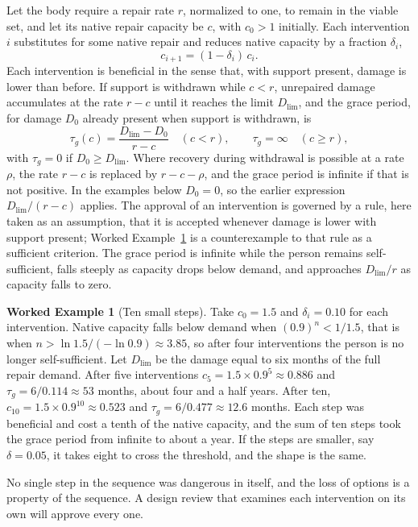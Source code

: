 \documentclass[11pt,openany]{book}
\theoremstyle{definition}
\newtheorem{example}{Worked Example}[chapter]
\theoremstyle{remark}
\begin{document}
Let the body require a repair rate $r$, normalized to one, to remain in the viable set, and let its native repair capacity be $c$, with $c_0>1$ initially. Each intervention $i$ substitutes for some native repair and reduces native capacity by a fraction $\delta_i$,
\begin{equation}
c_{i+1}=(1-\delta_i)\,c_i.
\label{eq:erode}
\end{equation}
Each intervention is beneficial in the sense that, with support present, damage is lower than before. If support is withdrawn while $c<r$, unrepaired damage accumulates at the rate $r-c$ until it reaches the limit $D_{\lim}$, and the grace period, for damage $D_0$ already present when support is withdrawn, is
\begin{equation}
\tau_g(c)=\frac{D_{\lim}-D_0}{r-c}\quad(c<r),\qquad\tau_g=\infty\quad(c\ge r),
\label{eq:grace}
\end{equation}
with $\tau_g=0$ if $D_0\ge D_{\lim}$. Where recovery during withdrawal is possible at a rate $\rho$, the rate $r-c$ is replaced by $r-c-\rho$, and the grace period is infinite if that is not positive. In the examples below $D_0=0$, so the earlier expression $D_{\lim}/(r-c)$ applies. The approval of an intervention is governed by a rule, here taken as an assumption, that it is accepted whenever damage is lower with support present; Worked Example~\ref{ex:steps} is a counterexample to that rule as a sufficient criterion.
The grace period is infinite while the person remains self-sufficient, falls steeply as capacity drops below demand, and approaches $D_{\lim}/r$ as capacity falls to zero.

\begin{example}[Ten small steps]
\label{ex:steps}
Take $c_0=1.5$ and $\delta_i=0.10$ for each intervention. Native capacity falls below demand when $(0.9)^n<1/1.5$, that is when $n>\ln1.5/(-\ln0.9)\approx3.85$, so after four interventions the person is no longer self-sufficient. Let $D_{\lim}$ be the damage equal to six months of the full repair demand. After five interventions $c_5=1.5\times0.9^{5}\approx0.886$ and $\tau_g=6/0.114\approx53$ months, about four and a half years. After ten, $c_{10}=1.5\times0.9^{10}\approx0.523$ and $\tau_g=6/0.477\approx12.6$ months. Each step was beneficial and cost a tenth of the native capacity, and the sum of ten steps took the grace period from infinite to about a year. If the steps are smaller, say $\delta=0.05$, it takes eight to cross the threshold, and the shape is the same.

No single step in the sequence was dangerous in itself, and the loss of options is a property of the sequence. A design review that examines each intervention on its own will approve every one.
\end{example}
\end{document}
